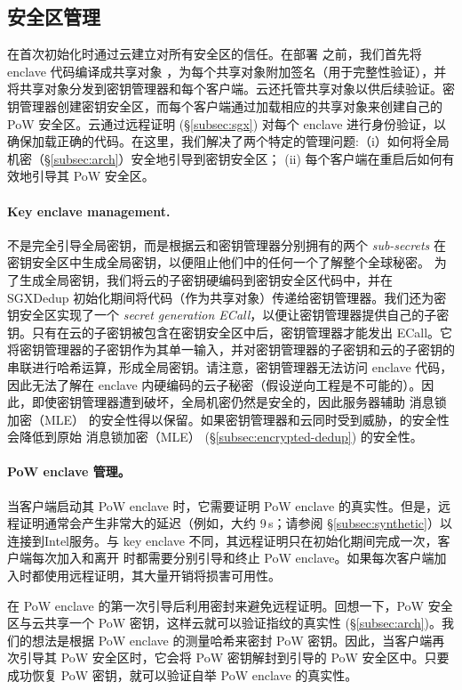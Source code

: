 \subsection{安全区管理}
\label{subsec:enclave-management}

\sysnameS 在首次初始化时通过云建立对所有安全区的信任。在部署 \sysnameS 之前，我们首先将 enclave 代码编译成共享对象 \cite{sgx}，为每个共享对象附加签名（用于完整性验证），并将共享对象分发到密钥管理器和每个客户端。云还托管共享对象以供后续验证。密钥管理器创建密钥安全区，而每个客户端通过加载相应的共享对象来创建自己的 PoW 安全区。云通过远程证明 (\S\ref{subsec:sgx}) 对每个 enclave 进行身份验证，以确保加载正确的代码。在这里，我们解决了两个特定的管理问题:（i）如何将全局机密（\S\ref{subsec:arch}）安全地引导到密钥安全区； (ii) 每个客户端在重启后如何有效地引导其 PoW 安全区。

\paragraph{Key enclave management.} \sysnameS 不是完全引导全局密钥，而是根据云和密钥管理器分别拥有的两个 \textit{ sub-secrets} 在密钥安全区中生成全局密钥，以便阻止他们中的任何一个了解整个全球秘密。
为了生成全局密钥，我们将云的子密钥硬编码到密钥安全区代码中，并在 SGXDedup 初始化期间将代码（作为共享对象）传递给密钥管理器。我们还为密钥安全区实现了一个\textit{ secret generation ECall}，以便让密钥管理器提供自己的子密钥。只有在云的子密钥被包含在密钥安全区中后，密钥管理器才能发出 ECall。它将密钥管理器的子密钥作为其单一输入，并对密钥管理器的子密钥和云的子密钥的串联进行哈希运算，形成全局密钥。请注意，密钥管理器无法访问 enclave 代码，因此无法了解在 enclave 内硬编码的云子秘密（假设逆向工程是不可能的）。因此，即使密钥管理器遭到破坏，全局机密仍然是安全的，因此服务器辅助 消息锁加密（MLE） 的安全性得以保留。如果密钥管理器和云同时受到威胁，\sysnameS 的安全性会降低到原始 消息锁加密（MLE） (\S\ref{subsec:encrypted-dedup}) 的安全性。

\paragraph{PoW enclave 管理。} 当客户端启动其 PoW enclave 时，它​​需要证明 PoW enclave 的真实性。但是，远程证明通常会产生非常大的延迟（例如，大约 9\,s；请参阅 \S\ref{subsec:synthetic}）以连接到Intel服务。与 key enclave 不同，其远程证明只在初始化期间完成一次，客户端每次加入和离开 \sysnameS 时都需要分别引导和终止 PoW enclave。如果每次客户端加入时都使用远程证明，其大量开销将损害可用性。

\sysnameS 在 PoW enclave 的第一次引导后利用密封来避免远程证明。回想一下，PoW 安全区与云共享一个 PoW 密钥，这样云就可以验证指纹的真实性 (\S\ref{subsec:arch})。我们的想法是根据 PoW enclave 的测量哈希来密封 PoW 密钥。因此，当客户端再次引导其 PoW 安全区时，它会将 PoW 密钥解封到引导的 PoW 安全区中。只要成功恢复 PoW 密钥，就可以验证自举 PoW enclave 的真实性。

